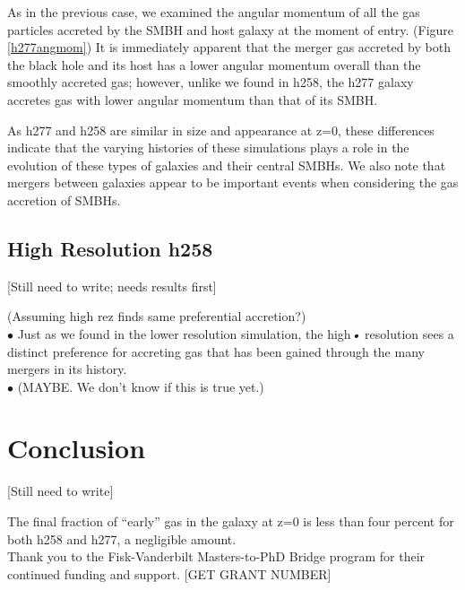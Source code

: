 \documentclass[manuscript]{aastex}
\begin{document}
As in the previous case, we examined the angular momentum of all the gas particles accreted by the SMBH and host galaxy at the moment of entry. (Figure \ref{h277angmom}) It is immediately apparent that the merger gas accreted by both the black hole and its host has a lower angular momentum overall than the smoothly accreted gas; however, unlike we found in h258, the h277 galaxy accretes gas with lower angular momentum than that of its SMBH.

As h277 and h258 are similar in size and appearance at z=0, these differences indicate that the varying histories of these simulations plays a role in the evolution of these types of galaxies and their central SMBHs. We also note that mergers between galaxies appear to be important events when considering the gas accretion of SMBHs.
	

\subsection{High Resolution h258}

[Still need to write; needs results first]

(Assuming high rez finds same preferential accretion?)\\
$\bullet$ Just as we found in the lower resolution simulation, the high\textit{•} resolution sees a distinct preference for accreting gas that has been gained through the many mergers in its history. \\
$\bullet$ (MAYBE. We don't know if this is true yet.)\\


\section{Conclusion}

[Still need to write]

The final fraction of ``early'' gas in the galaxy at z=0 is less than four percent for both h258 and h277, a negligible amount.  \\


\acknowledgments
Thank you to the Fisk-Vanderbilt Masters-to-PhD Bridge program for their continued funding and support. [GET GRANT NUMBER]

\end{document}
